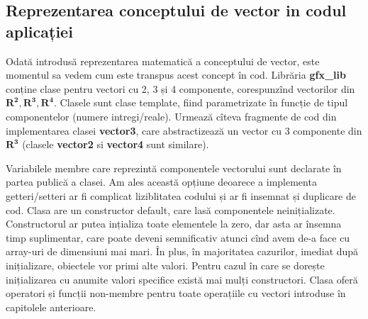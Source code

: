 \subsection{Reprezentarea conceptului de vector in codul aplicației}
\label{ch1:sec_vectors:sub_vector_cpp_impl}
\indent

Odată introdusă reprezentarea matematică a conceptului de vector, este momentul
sa vedem cum este transpus acest concept în cod. Librăria \textbf{gfx\_lib}
conține clase pentru vectori cu 2, 3 și 4 componente, corespunzînd vectorilor
din $\mathbf{R^2, R^3, R^4}$. Clasele sunt clase template, fiind parametrizate
în funcție de tipul componentelor (numere intregi/reale).
Urmează cîteva fragmente de cod din implementarea clasei \textbf{vector3}, care
abstractizează un vector cu 3 componente din $\mathbf{R^3}$ (clasele
\textbf{vector2} si \textbf{vector4} sunt similare).



Variabilele membre care reprezintă componentele vectorului sunt declarate în
partea publică a clasei. Am ales această opțiune deoarece a implementa
getteri/setteri ar fi complicat liziblitatea codului și ar fi insemnat 
și duplicare de cod. Clasa are un constructor default, care lasă componentele
neinițializate. Constructorul ar putea ințializa toate elementele la zero, dar
asta ar însemna timp suplimentar, care poate deveni semnificativ atunci cînd 
avem de-a face cu array-uri de dimensiuni mai mari. În plus, în majoritatea
cazurilor, imediat după inițializare, obiectele vor primi alte valori. Pentru
cazul în care se dorește inițializarea cu anumite valori specifice există mai mulți
constructori. Clasa oferă operatori și funcții non-membre pentru toate
operațiile cu vectori introduse în capitolele anterioare.

